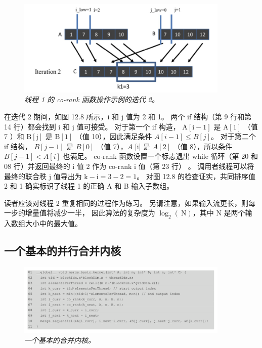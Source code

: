 \begin{figure}[H]
	\centering
	\includegraphics[width=0.9\textwidth]{figs/F12.8.png}
	\caption{\textit{线程 1 的 co-rank 函数操作示例的迭代 2。}}
\end{figure}

在迭代 2 期间，如图 12.8 所示，$\mathrm{i}$ 和 $\mathrm{j}$ 值为 2 和 1。
两个 if 结构（第 9 行和第 14 行）都会找到 $\mathrm{i}$ 和 $\mathrm{j}$ 值可接受。 
对于第一个 if 构造， $\mathrm{A}[\mathrm{i}-1]$ 是 $\mathrm{A}[1]$ （值 7 ）和 $\mathrm{B}[\mathrm{j}] $ 是 $\mathrm{B}[1]$ （值 10），因此满足条件 $A[i-1] \leq B[j]$。 
对于第二个 if 结构， $B[j-1]$ 是 $B[0]$ （值 7），$A$ [i] 是 $A[2]$ （值 8），所以条件 $B [j-1]<A[i]$ 也满足。 
co-rank 函数设置一个标志退出 while 循环（第 20 和 08 行）并返回最终的 $\mathrm{i}$ 值 2 作为 co-rank $\mathrm{i}$ 值（第 23 行） 。 
调用者线程可以将最终的联合秩 $\mathrm{j}$ 值导出为 $\mathrm{k}-\mathrm{i}=3-2=1$。 
对图 12.8 的检查证实，共同排序值 2 和 1 确实标识了线程 1 的正确 A 和 B 输入子数组。

读者应该对线程 2 重复相同的过程作为练习。 
另请注意，如果输入流更长，则每一步的增量值将减少一半，
因此算法的复杂度为 $\log _{2}(\mathrm{~N})$，其中 $\mathrm{N}$ 是两个输入数组大小中的最大值。

\subsection{一个基本的并行合并内核}
\begin{figure}[H]
	\centering
	\includegraphics[width=0.9\textwidth]{figs/F12.9.png}
	\caption{\textit{一个基本的合并内核。}}
\end{figure}

